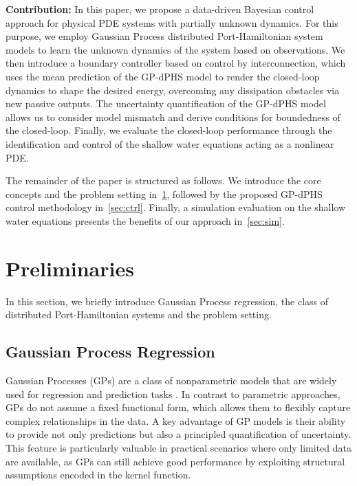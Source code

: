 \documentclass[letterpaper, 10 pt, conference]{ieeeconf}  %
\newcounter{part} %
\begin{document}
\textbf{Contribution:} In this paper, we propose a data-driven Bayesian control approach for physical PDE systems with partially unknown dynamics. For this purpose, we employ Gaussian Process distributed Port-Hamiltonian system models to learn the unknown dynamics of the system based on observations. We then introduce a boundary controller based on control by interconnection, which uses the mean prediction of the GP-dPHS model to render the closed-loop dynamics to shape the desired energy, overcoming any dissipation obstacles via new passive outputs. The uncertainty quantification of the GP-dPHS model allows us to consider model mismatch and derive conditions for boundedness of the closed-loop. Finally, we evaluate the closed-loop performance through the identification and control of the shallow water equations acting as a nonlinear PDE.

The remainder of the paper is structured as follows. We introduce the core concepts and the problem setting in~\cref{sec:def}, followed by the proposed GP-dPHS control methodology in~\cref{sec:ctrl}. Finally, a simulation evaluation on the shallow water equations presents the benefits of our approach in~\cref{sec:sim}.


\section{Preliminaries}\label{sec:def}
In this section, we briefly introduce Gaussian Process regression, the class of distributed Port-Hamiltonian systems and the problem setting. 
\subsection{Gaussian Process Regression}\label{sec:GPIntro}
Gaussian Processes (GPs) are a class of nonparametric models that are widely used for regression and prediction tasks \cite{rasmussen2006gaussian}. 
In contrast to parametric approaches, GPs do not assume a fixed functional form, which allows them to flexibly capture complex relationships in the data. 
A key advantage of GP models is their ability to provide not only predictions but also a principled quantification of uncertainty. 
This feature is particularly valuable in practical scenarios where only limited data are available, as GPs can still achieve good performance by exploiting structural assumptions encoded in the kernel function.
\end{document}

